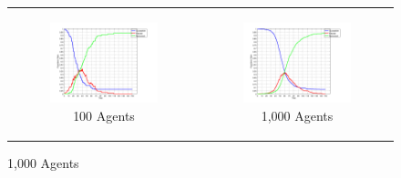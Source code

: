 \begin{figure}
\begin{center}
	\begin{tabular}{c c}
		\begin{subfigure}[b]{0.3\textwidth}
			\centering
			\includegraphics[width=1\textwidth, angle=0]{./shared/fig/frabs/SIR_100agents_150t_01dt_NOSS_parallel.png}
			\caption{100 Agents}
			\label{fig:sir_abs_approximating_100}
		\end{subfigure}
    	&
		\begin{subfigure}[b]{0.3\textwidth}
			\centering
			\includegraphics[width=1\textwidth, angle=0]{./shared/fig/frabs/SIR_1000agents_150t_01dt_NOSS_parallel.png}
			\caption{1,000 Agents}
			\label{fig:sir_abs_approximating_1000}
		\end{subfigure}
    	

\end{tabular}
\end{center}
\end{figure}
